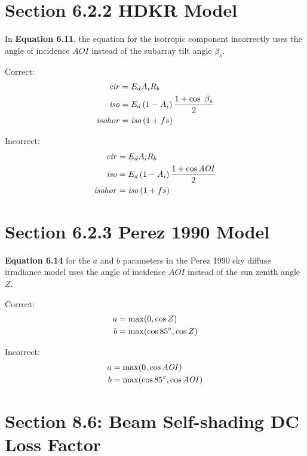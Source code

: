 \documentclass[report]{nrel}
\begin{document}
\section*{Section 6.2.2 HDKR Model}

In \textbf{Equation 6.11}, the equation for the isotropic component incorrectly uses the angle of incidence $\mathit{AOI}$ instead of the subarray tilt angle $\beta_s$.

Correct:
\begin{align*}
\mathit{cir} &= E_d A_i R_b \notag\\
\mathit{iso} &= E_d \left( 1 - A_i \right) \frac{1 + \cos\ \beta_s}{2} \notag\\
\mathit{isohor} &= \mathit{iso} \left( 1 + f s \right)
\end{align*}

Incorrect:
\begin{align*}
\mathit{cir} &= E_d A_i R_b \notag\\
\mathit{iso} &= E_d \left( 1 - A_i \right) \frac{1 + \cos\mathit{AOI}}{2} \notag\\
\mathit{isohor} &= \mathit{iso} \left( 1 + f s \right)
\end{align*}

\section*{Section 6.2.3 Perez 1990 Model}

\textbf{Equation 6.14} for the $a$ and $b$ parameters in the Perez 1990 sky diffuse irradiance model uses the angle of incidence $AOI$ instead of the sun zenith angle $Z$.

Correct:
\begin{align*}
a &= \max( 0, \cos Z ) \notag\\
b & =\max( \cos85\degree, \cos Z) 
\end{align*}

Incorrect:
\begin{align*}
a &= \max( 0, \cos \mathit{AOI} ) \notag\\
b & =\max( \cos85\degree, \cos \mathit{AOI}) 
\end{align*}

\section*{Section 8.6: Beam Self-shading DC Loss Factor}
\end{document}
